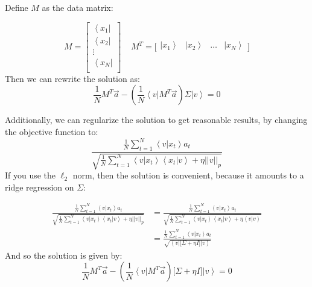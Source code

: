 \documentclass[onecolumn,floatfix,nofootinbib,aps,notitlepage]{revtex4-1}
\newcommand{\bra}[1]{\ensuremath{\left\langle#1\right|}}
\newcommand{\ket}[1]{\ensuremath{\left|#1\right\rangle}}
\newcommand{\braket}[2]{\ensuremath{\left\langle#1\right|\left.#2\right\rangle}}
\begin{document}
Define $M$ as the data matrix:

$$ M = \left[ 
\begin{array}{c}
\bra{x_1} \\
\bra{x_2} \\
\vdots \\
\bra{x_N} \\
\end{array} \right] \;\;\;\;
M^T = \Big[ 
\begin{array}{cccc}
\ket{x_1} & \ket{x_2} & \hdots & \ket{x_N} \\
\end{array} \Big]
$$
Then we can rewrite the solution as:
$$ \frac{1}{N} M^T \vec{a} - \left( \frac{1}{N} \bra{v} M^T \vec{a}\right) \Sigma \ket{v} = 0 $$

Additionally, we can regularize the solution to get reasonable results, by changing the objective function to:
$$ \frac{\frac{1}{N}\sum_{t=1}^N \braket{v}{x_t} a_t}
	{\sqrt{\frac{1}{N}\sum_{t=1}^N \braket{v}{x_t}\braket{x_t}{v} + \eta || v ||_p}} $$ If you use the $\ell_2$ norm, then the solution is convenient, because it amounts to a ridge regression on $\Sigma$:

\begin{align*}
\frac{\frac{1}{N}\sum_{t=1}^N \braket{v}{x_t} a_t}
	{\sqrt{\frac{1}{N}\sum_{t=1}^N \braket{v}{x_t}\braket{x_t}{v} + \eta || v ||_p}} &= \frac{\frac{1}{N}\sum_{t=1}^N \braket{v}{x_t} a_t}
	{\sqrt{\frac{1}{N}\sum_{t=1}^N \braket{v}{x_t}\braket{x_t}{v} + \eta \braket{v}{v}}} \\
	&= \frac{\frac{1}{N}\sum_{t=1}^N \braket{v}{x_t} a_t}
	{\sqrt{\bra{v}\Big[\Sigma + \eta I\Big]\ket{v}}} 
\end{align*} And so the solution is given by:
$$ \frac{1}{N} M^T \vec{a} - \left( \frac{1}{N} \bra{v} M^T \vec{a}\right) \big[\Sigma + \eta I\big] \ket{v} = 0 $$
 
\end{document}
